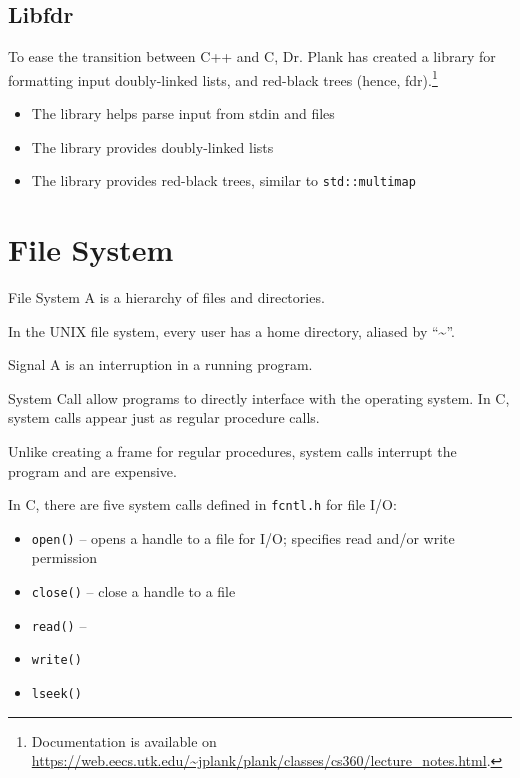 \documentclass[12pt]{report}
\begin{document}
\section{Libfdr}
To ease the transition between C++ and C, Dr. Plank has created a library for formatting input doubly-linked lists, and red-black trees (hence, fdr).\footnote{Documentation is available on \url{https://web.eecs.utk.edu/\~jplank/plank/classes/cs360/lecture_notes.html}.}
\begin{itemize}
    \item The  library helps parse input from stdin and files
    \item The  library provides doubly-linked lists
    \item The  library provides red-black trees, similar to \texttt{std::multimap}
\end{itemize}

\chapter{File System}

\begin{dfnbox}{File System}{}
    A  is a hierarchy of files and directories.
\end{dfnbox}

In the UNIX file system, every user has a home directory, aliased by ``\textasciitilde''.

\begin{dfnbox}{Signal}{}
    A  is an interruption in a running program.
\end{dfnbox}

\begin{dfnbox}{System Call}{}
     allow programs to directly interface with the operating system. In C, system calls appear just as regular procedure calls.
\end{dfnbox}

Unlike creating a frame for regular procedures, system calls interrupt the program and are expensive.

In C, there are five system calls defined in \texttt{fcntl.h} for file I/O:
\begin{itemize}[noitemsep]
    \item \texttt{open()} -- opens a handle to a file for I/O; specifies read and/or write permission
    \item \texttt{close()} -- close a handle to a file
    \item \texttt{read()} --
    \item \texttt{write()}
    \item \texttt{lseek()}
\end{itemize}

\amzindex
\end{document}
